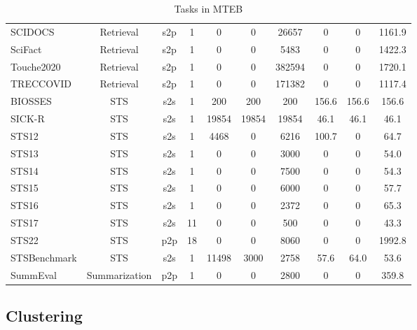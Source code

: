 \documentclass[11pt]{article}
\begin{document}
\begin{table*}[!t]
{\begin{tabular}{l|ccccccccc}
SCIDOCS & Retrieval & s2p & 1 & 0 & 0 & 26657 & 0 & 0 & 1161.9  \\
SciFact & Retrieval & s2p & 1 & 0 & 0 & 5483 & 0 & 0 & 1422.3  \\
Touche2020 & Retrieval & s2p & 1 & 0 & 0 & 382594 & 0 & 0 & 1720.1  \\
TRECCOVID & Retrieval & s2p & 1 & 0 & 0 & 171382 & 0 & 0 & 1117.4  \\
\midrule
BIOSSES & STS & s2s & 1 & 200 & 200 & 200 & 156.6 & 156.6 & 156.6  \\
SICK-R & STS & s2s & 1 & 19854 & 19854 & 19854 & 46.1 & 46.1 & 46.1  \\
STS12 & STS & s2s & 1 & 4468 & 0 & 6216 & 100.7 & 0 & 64.7  \\
STS13 & STS & s2s & 1 & 0 & 0 & 3000 & 0 & 0 & 54.0  \\
STS14 & STS & s2s & 1 & 0 & 0 & 7500 & 0 & 0 & 54.3  \\
STS15 & STS & s2s & 1 & 0 & 0 & 6000 & 0 & 0 & 57.7  \\
STS16 & STS & s2s & 1 & 0 & 0 & 2372 & 0 & 0 & 65.3  \\
STS17 & STS & s2s & 11 & 0 & 0 & 500 & 0 & 0 & 43.3  \\
STS22 & STS & p2p & 18 & 0 & 0 & 8060 & 0 & 0 & 1992.8  \\
STSBenchmark & STS & s2s & 1 & 11498 & 3000 & 2758 & 57.6 & 64.0 & 53.6  \\
\midrule
SummEval & Summarization & p2p & 1 & 0 & 0 & 2800 & 0 & 0 & 359.8 \\
    \bottomrule
    \end{tabular}}
    \caption{Tasks in MTEB}
    \label{tab:tasks}
\end{table*}



\subsection{Clustering}
\end{document}
